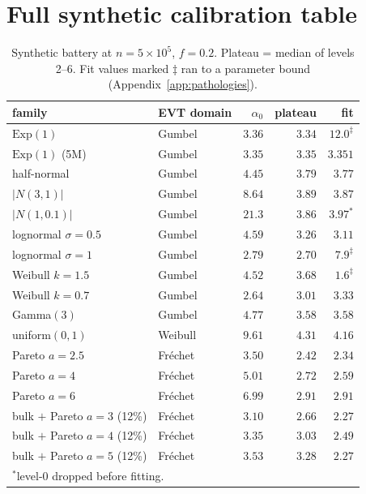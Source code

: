 \documentclass[11pt,a4paper]{article}
\theoremstyle{remark}
\newcommand{\Exp}{\mathrm{Exp}}
\begin{document}
\section{Full synthetic calibration table}\label{app:battery}

\begin{table}[h]
\centering\small
\caption{Synthetic battery at $n = 5\times10^{5}$, $f = 0.2$. Plateau = median of levels 2--6.
Fit values marked $\ddagger$ ran to a parameter bound (Appendix~\ref{app:pathologies}).}
\begin{tabular}{llrrr}
\toprule
family & EVT domain & $\alpha_0$ & plateau & fit\\
\midrule
$\Exp(1)$                & Gumbel & $3.36$ & $3.34$ & $12.0^{\ddagger}$\\
$\Exp(1)$ (5M)           & Gumbel & $3.35$ & $3.35$ & $3.351$\\
half-normal              & Gumbel & $4.45$ & $3.79$ & $3.77$\\
$|N(3,1)|$               & Gumbel & $8.64$ & $3.89$ & $3.87$\\
$|N(1,0.1)|$             & Gumbel & $21.3$ & $3.86$ & $3.97^{*}$\\
lognormal $\sigma{=}0.5$ & Gumbel & $4.59$ & $3.26$ & $3.11$\\
lognormal $\sigma{=}1$   & Gumbel & $2.79$ & $2.70$ & $7.9^{\ddagger}$\\
Weibull $k{=}1.5$        & Gumbel & $4.52$ & $3.68$ & $1.6^{\ddagger}$\\
Weibull $k{=}0.7$        & Gumbel & $2.64$ & $3.01$ & $3.33$\\
Gamma$(3)$               & Gumbel & $4.77$ & $3.58$ & $3.58$\\
uniform$(0,1)$           & Weibull & $9.61$ & $4.31$ & $4.16$\\
Pareto $a{=}2.5$         & Fr\'echet & $3.50$ & $2.42$ & $2.34$\\
Pareto $a{=}4$           & Fr\'echet & $5.01$ & $2.72$ & $2.59$\\
Pareto $a{=}6$           & Fr\'echet & $6.99$ & $2.91$ & $2.91$\\
bulk $+$ Pareto $a{=}3$ (12\%) & Fr\'echet & $3.10$ & $2.66$ & $2.27$\\
bulk $+$ Pareto $a{=}4$ (12\%) & Fr\'echet & $3.35$ & $3.03$ & $2.49$\\
bulk $+$ Pareto $a{=}5$ (12\%) & Fr\'echet & $3.53$ & $3.28$ & $2.27$\\
\bottomrule
\multicolumn{5}{l}{\footnotesize $^{*}$level-0 dropped before fitting.}
\end{tabular}
\end{table}
\end{document}
